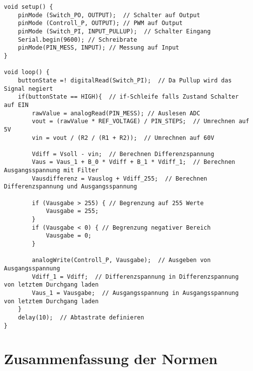 \begin{appendix}
\begin{lstlisting}[basicstyle=\tiny,style=myArduino]
void setup() {
	pinMode (Switch_PO, OUTPUT);  // Schalter auf Output
	pinMode (Controll_P, OUTPUT); // PWM auf Output
	pinMode (Switch_PI, INPUT_PULLUP);  // Schalter Eingang
	Serial.begin(9600); // Schreibrate
	pinMode(PIN_MESS, INPUT); // Messung auf Input
}

void loop() {
	buttonState =! digitalRead(Switch_PI);  // Da Pullup wird das Signal negiert
	if(buttonState == HIGH){  // if-Schleife falls Zustand Schalter auf EIN
		rawValue = analogRead(PIN_MESS); // Auslesen ADC
		vout = (rawValue * REF_VOLTAGE) / PIN_STEPS;  // Umrechnen auf 5V
		vin = vout / (R2 / (R1 + R2));  // Umrechnen auf 60V
		
		Vdiff = Vsoll - vin;  // Berechnen Differenzspannung
		Vaus = Vaus_1 + B_0 * Vdiff + B_1 * Vdiff_1;  // Berechnen Ausgangsspannung mit Filter
		Vausdifferenz = Vauslog + Vdiff_255;  // Berechnen Differenzspannung und Ausgangsspannung
		
		if (Vausgabe > 255) { // Begrenzung auf 255 Werte
			Vausgabe = 255;
		}
		if (Vausgabe < 0) { // Begrenzung negativer Bereich
			Vausgabe = 0;
		}
		
		analogWrite(Controll_P, Vausgabe);  // Ausgeben von Ausgangsspannung
		Vdiff_1 = Vdiff;  // Differenzspannung in Differenzspannung von letztem Durchgang laden
		Vaus_1 = Vausgabe;  // Ausgangsspannung in Ausgangsspannung von letztem Durchgang laden
	}
	delay(10);  // Abtastrate definieren
}
\end{lstlisting}

\section{Zusammenfassung der Normen}\label{sec:Zusammenfassung_Normen}


\end{appendix}
